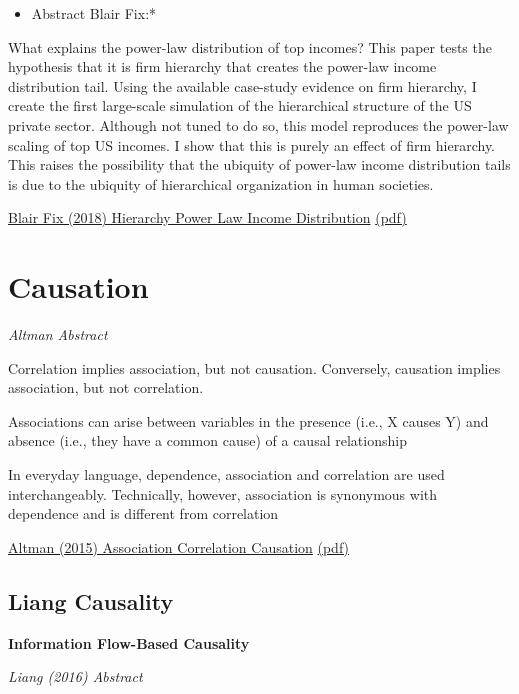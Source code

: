 \documentclass[
]{book}
\providecommand{\tightlist}{%
  \setlength{\itemsep}{0pt}\setlength{\parskip}{0pt}}
\begin{document}
\begin{itemize}
\tightlist
\item
  Abstract Blair Fix:*
\end{itemize}

What explains the power-law distribution of top incomes? This paper tests the
hypothesis that it is firm hierarchy that creates the power-law income distribution tail.
Using the available case-study evidence on firm hierarchy, I create the
first large-scale simulation of the hierarchical structure of the US private sector.
Although not tuned to do so, this model reproduces the power-law scaling of
top US incomes. I show that this is purely an effect of firm hierarchy. This raises
the possibility that the ubiquity of power-law income distribution tails is due to
the ubiquity of hierarchical organization in human societies.

\href{https://osf.io/u95dk/}{Blair Fix (2018) Hierarchy Power Law Income Distribution}
\href{pdf/Blair_Fix_2018_Hierarchy_Power_law.pdf}{(pdf)}

\hypertarget{causation}{%
\chapter{Causation}\label{causation}}

\emph{Altman Abstract}

Correlation implies association, but not causation.
Conversely, causation implies association, but not correlation.

Associations can arise between variables in the presence (i.e., X causes Y) and
absence (i.e., they have a common cause) of a causal relationship

In everyday language, dependence, association and correlation are used interchangeably. Technically, however, association is synonymous with dependence and is different from correlation

\href{https://www.nature.com/articles/nmeth.3587}{Altman (2015) Association Correlation Causation}
\href{pdf/Altman_2015_Association_Correlation_and_Causation.pdf}{(pdf)}

\hypertarget{liang-causality}{%
\section{Liang Causality}\label{liang-causality}}

\textbf{Information Flow-Based Causality}

\emph{Liang (2016) Abstract}
\end{document}
